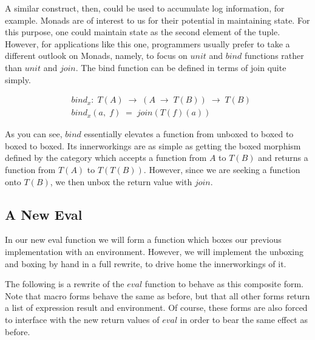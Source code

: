 A similar construct, then, could be used to accumulate log information, for example.
Monads are of interest to us for their potential in maintaining state. For this
purpose, one could maintain state as the second element of the tuple. However, for
applications like this one, programmers usually prefer to take a different outlook on
Monads, namely, to focus on $unit$ and $bind$ functions rather than $unit$ and $join$.
The bind function can be defined in terms of join quite simply.

\begin{figure}[ht]
\caption{}\label{}
\begin{align*}
& bind_{x}: \; T(A) \; \to \; (A \; \to \; T(B)) \; \to \; T(B)
\\& bind_{x}(a, \; f) \; = \; join(T(f)(a))
\end{align*}
\end{figure}

As you can see, $bind$ essentially elevates a function from unboxed to boxed to boxed
to boxed. Its innerworkings are as simple as getting the boxed morphism defined by the
category which accepts a function from $A$ to $T(B)$ and returns a function from $T(A)$
to $T(T(B))$. However, since we are seeking a function onto $T(B)$, we then unbox the
return value with $join$.

\subsection{A New Eval}
In our new eval function we will form a function which boxes our previous
implementation with an environment. However, we will implement the unboxing
and boxing by hand in a full rewrite, to drive home the innerworkings of it.

The following is a rewrite of the $eval$ function to behave as this composite
form. Note that macro forms behave the same as before, but that all other
forms return a list of expression result and environment. Of course, these
forms are also forced to interface with the new return values of $eval$ in
order to bear the same effect as before.

